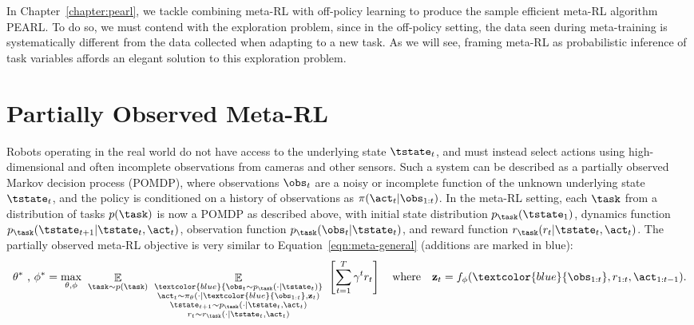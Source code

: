 In Chapter~\ref{chapter:pearl}, we tackle combining meta-RL with off-policy learning to produce the sample efficient meta-RL algorithm PEARL.
To do so, we must contend with the exploration problem, since in the off-policy setting, the data seen during meta-training is systematically different from the data collected when adapting to a new task.
As we will see, framing meta-RL as probabilistic inference of task variables affords an elegant solution to this exploration problem.

\section{Partially Observed Meta-RL}
Robots operating in the real world do not have access to the underlying state $\tstate_t$, and must instead select actions using high-dimensional and often incomplete observations from cameras and other sensors. 
Such a system can be described as a partially observed Markov decision process (POMDP), where observations $\obs_t$ are a noisy or incomplete function of the unknown underlying state $\tstate_t$, and the policy is conditioned on a history of observations as $\pi(\act_t | \obs_{1:t})$.
In the meta-RL setting, each $\task$ from a distribution of tasks $p(\task)$ is now a POMDP as described above, with initial state distribution $p_\task(\tstate_1)$, dynamics function $p_\task(\tstate_{t+1}|\tstate_t,\act_t)$, observation function $p_\task(\obs_t | \tstate_t)$, and reward function $r_\task(r_t|\tstate_t,\act_t)$.
The partially observed meta-RL objective is very similar to Equation~\ref{eqn:meta-general} (additions are marked in blue):
\begin{align}\vspace{-0.2in}
    \theta^*\text{ , } \phi^* = \max_{\theta,\phi} \hspace{4pt} \mathop{\mathbb{E}}_{\task \sim p(\task)} \hspace{4pt}
    \mathop{\mathbb{E}}_{\substack{
    \textcolor{blue}{\obs_{t} \sim p_\task(\cdot|\tstate_t)} 
    \\ \act_t \sim \pi_\theta(\cdot|\textcolor{blue}{\obs_{1:t}},\mathbf{z}_t) 
    \\ \tstate_{t+1} \sim p_\task(\cdot|\tstate_t,\act_t) 
    \\ r_t \sim r_\task(\cdot | \tstate_t, \act_t)
    }} \hspace{4pt}
    \left[ \sum_{t=1}^T  \gamma^t r_t \right]
    \hspace{10pt} \text{where} \hspace{10pt} \mathbf{z}_t = f_{\phi}(\textcolor{blue}{\obs_{1:t}}, r_{1:t}, \act_{1:t-1}).
    \label{eqn:meta-general-partial}
\end{align}
